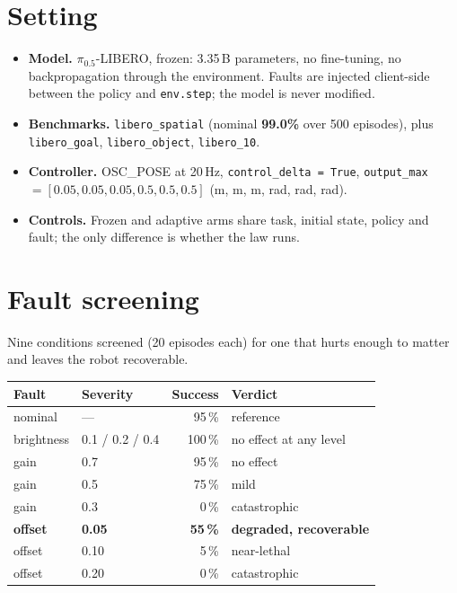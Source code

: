 \documentclass[11pt,a4paper]{article}
\newcommand{\code}[1]{\texttt{\small #1}}
\begin{document}
\section{Setting}

{\sloppy
\begin{itemize}[leftmargin=1.4em,itemsep=2pt]
  \item \textbf{Model.} $\pi_{0.5}$-LIBERO, frozen: 3.35\,B parameters, no
        fine-tuning, no backpropagation through the environment. Faults are
        injected client-side between the policy and \code{env.step}; the model is
        never modified.
  \item \textbf{Benchmarks.} \code{libero\_spatial} (nominal \textbf{99.0\%} over
        500 episodes), plus \code{libero\_goal}, \code{libero\_object},
        \code{libero\_10}.
  \item \textbf{Controller.} OSC\_POSE at 20\,Hz, \code{control\_delta = True},
        \code{output\_max} $= [0.05,0.05,0.05,0.5,0.5,0.5]$ (m, m, m, rad, rad, rad).
  \item \textbf{Controls.} Frozen and adaptive arms share task, initial state,
        policy and fault; the only difference is whether the law runs.
\end{itemize}
}

\section{Fault screening}
\label{sec:screen}

Nine conditions screened (20 episodes each) for one that hurts enough to matter
and leaves the robot recoverable.

\begin{center}
\begin{tabular}{llr>{\raggedright\arraybackslash}p{5.0cm}}
\toprule
\textbf{Fault} & \textbf{Severity} & \textbf{Success} & \textbf{Verdict} \\
\midrule
nominal      & ---   & 95\,\%  & reference \\
brightness   & 0.1 / 0.2 / 0.4 & 100\,\% & no effect at any level \\
gain         & 0.7   & 95\,\%  & no effect \\
gain         & 0.5   & 75\,\%  & mild \\
gain         & 0.3   & 0\,\%   & catastrophic \\
\textbf{offset} & \textbf{0.05} & \textbf{55\,\%} & \textbf{degraded, recoverable} \\
offset       & 0.10  & 5\,\%   & near-lethal \\
offset       & 0.20  & 0\,\%   & catastrophic \\
\bottomrule
\end{tabular}
\end{center}
\end{document}
